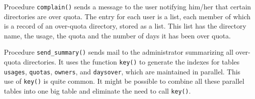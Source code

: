 Procedure \texttt{complain()} sends a message to the user notifying
him/her that certain directories are over quota. The entry for each
user is a list, each member of which is a record of an over-quota
directory, stored as a list. This list has the directory name, the
usage, the quota and the number of days it has been over quota.


Procedure \texttt{send\_summary()} sends mail to the administrator
summarizing all over-quota directories. It uses the function
\texttt{key()} to generate the indexes for tables
\texttt{usages}, \texttt{quotas}, \texttt{owners}, and
\texttt{daysover}, which are maintained in parallel. This use of
\texttt{key()} is quite common. It might be possible to combine all
these parallel tables into one big table and eliminate the need to call
\texttt{key()}.


